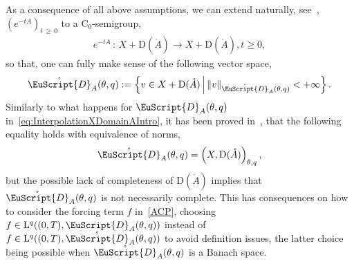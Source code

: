 \documentclass[10pt]{amsart}
\theoremstyle{definition}\newtheorem{defi}[theo]{Definition}\newtheorem{rema}[theo]{Remark}\newtheorem{exam}[theo]{Example}\newtheorem{exem}[theo]{Example}\newtheorem{nota}[theo]{Notation}
\newcommand{\rmD}{\mathrm{D}}
\newcommand{\rmL}{\mathrm{L}}
\newcommand{\rmC}{\mathrm{C}}
\newcommand{\rgA}{\mathring{A}}
\newcommand{\rgeusD}{\mathring{\eus{D}}}
\newcommand{\eus}{\EuScript}
\begin{document}
As a consequence of all above assumptions, we can extend naturally, see~\cite[Remark~2.7]{DanchinHieberMuchaTolk2020}, $(e^{-tA})_{t\,\geqslant\,0}$ to a $\rmC _0$-semigroup,
\begin{align*}
e^{-tA}\,:\, X+\rmD(\rgA) \longrightarrow X+\rmD(\rgA), t\geqslant 0,
\end{align*}
so that, one can fully make sense of the following vector space,
\begin{align*}
\rgeusD_{A}(\theta,q):= \left\{ v\in X+\rmD(\rgA)\,\middle|\, \| v\|_{\rgeusD_{A}(\theta,q)}<+\infty \right\} .
\end{align*}
Similarly to what happens for ${\eus{D}}_{A}(\theta,q)$ in~\eqref{eq:InterpolationXDomainAIntro}, it has been proved in~\cite[Proposition~2.12]{DanchinHieberMuchaTolk2020}, that the following equality holds with equivalence of norms,
\begin{align}
\rgeusD_{A}(\theta,q) = \left(X,\rmD(\rgA)\right)_{\theta,q},
\end{align}
but the possible lack of completeness of $\rmD(\rgA)$ implies that $\rgeusD_{A}(\theta,q)$ is not necessarily complete. This has consequences on how to consider the forcing term $f$ in~\eqref{ACP}, choosing $f\in \rmL^q((0,T),{\eus{D}}_{A}(\theta,q))$ instead of $f\in \rmL^q((0,T),\rgeusD_{A}(\theta,q))$ to avoid definition issues, the latter choice being possible when $\rgeusD_{A}(\theta,q)$ is a Banach space.
\end{document}
